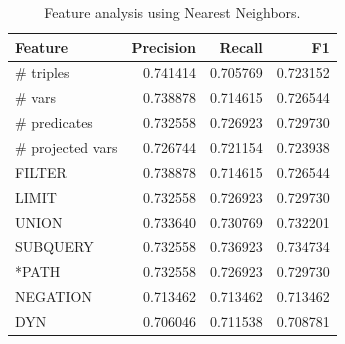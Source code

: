 \documentclass[runningheads]{llncs}
\begin{document}
\begin{table}[]
	\centering
	\caption{Feature analysis using Nearest Neighbors.}
	\label{tab:features}
	\begin{tabular}{|l|rrr|}        \hline
		Feature           & Precision & Recall & F1 \\    \hline
		\# triples        & 0.741414 & 0.705769 & 0.723152  \\
		\# vars           & 0.738878 & 0.714615 & 0.726544 \\
		\# predicates    & 0.732558 & 0.726923 & 0.729730 \\
		\# projected vars & 0.726744 & 0.721154 & 0.723938 \\
		FILTER            & 0.738878 & 0.714615 & 0.726544 \\
		LIMIT             & 0.732558 & 0.726923 & 0.729730 \\
		UNION             & 0.733640  & 0.730769 & 0.732201 \\
		SUBQUERY         & 0.732558 & 0.736923 & 0.734734  \\
		*PATH             & 0.732558 & 0.726923 & 0.729730 \\
		NEGATION          & 0.713462 & 0.713462 & 0.713462  \\
		DYN               & 0.706046 & 0.711538 & 0.708781    \\ \hline
	\end{tabular}
\end{table}
\end{document}
